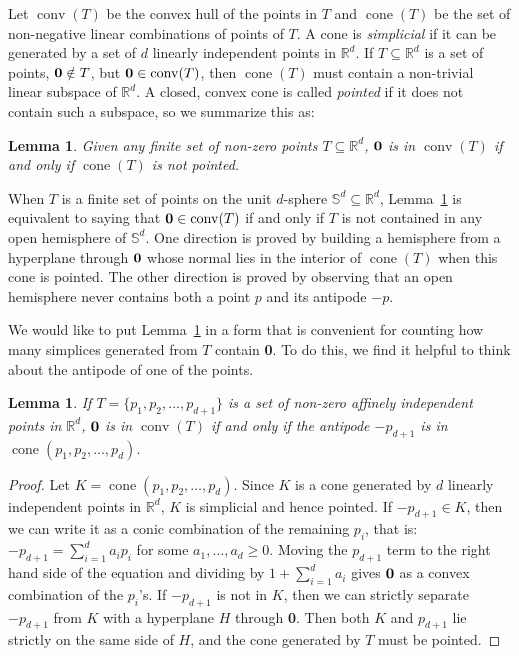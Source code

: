 \documentclass[epsbox,12pt,reqno]{amsart}
\newtheorem{lemma}[theorem]{Lemma}
\theoremstyle{definition}
\theoremstyle{remark}
\def\cone{\operatorname{cone}}
\def\conv{\operatorname{conv}}
\def\R{\mathbb{R}}
\def\Sph{\mathbb{S}}
\def\zero{{\bf 0}}
\begin{document}
Let $\conv(T)$ be the convex hull of the points in $T$ and 
$\cone(T)$ be the set of non-negative linear combinations 
of points of $T$.  A cone is {\it simplicial} if it 
can be generated by a set of $d$ linearly independent points
in $\R^d$.
If $T \subseteq \R^d$ is a set of points, $\zero \notin T$, but 
$\zero \in \conv(T)$, then $\cone(T)$ must contain a non-trivial
linear subspace of $\R^d$.  A closed, convex cone is called
{\it pointed} if it does not contain such a subspace, so we
summarize this as:
\begin{lemma}\label{le:cones}
Given any finite set of non-zero points $T \subseteq \R^d$, 
$\zero$ is in $\conv(T)$ if and
only if $\cone(T)$ is not pointed.
\end{lemma}
When $T$ is a finite set of points on the unit $d$-sphere 
$\Sph^d \subseteq \R^d$,
Lemma~\ref{le:cones} is equivalent to saying that $\zero \in \conv(T)$ 
if and only if $T$ is not contained in any open
hemisphere of $\Sph^d$.  One direction is proved by building a hemisphere
from a hyperplane through $\zero$ whose normal lies in the interior of
$\cone(T)$ when this cone is pointed.  The other direction is
proved by observing that an open hemisphere never contains both
a point $p$ and its antipode $-p$. 

We would like to put Lemma~\ref{le:cones} in a form that is convenient
for counting how many simplices generated from $T$ contain \zero.  
To do this, we find it helpful to think about the 
antipode of one of the points.
\begin{lemma}\label{le:antipodes}
If $T=\{p_1, p_2, \ldots, p_{d+1}\}$ is a set of non-zero affinely
independent points in $\R^d$,
$\zero$ is in $\conv(T)$ if and only if the antipode 
$-p_{d+1}$ is in $\cone(p_1, p_2, \ldots, p_d)$.
\end{lemma}
\begin{proof}
Let $K = \cone(p_1, p_2, \ldots, p_d)$.
Since $K$ is a cone generated by $d$ linearly independent points in 
$\R^d$, $K$ is simplicial and hence pointed.  
If $-p_{d+1} \in K$, then we can write it as a conic combination
of the remaining $p_i$, that is:
${-p_{d+1} = \sum_{i=1}^d a_i p_i}$
for some $a_1, \ldots, a_d \ge 0$.  Moving the $p_{d+1}$ term 
to the right hand side of the equation and dividing by $1+\sum_{i=1}^d a_i$
gives $\zero$ as a convex combination of the $p_i$'s.
If $-p_{d+1}$ is not in $K$, then we can
strictly separate $-p_{d+1}$ from $K$ with a hyperplane $H$ through \zero.
Then both $K$ and $p_{d+1}$ lie strictly on the same side of $H$, and the
cone generated by $T$ must be pointed.
\end{proof}
\end{document}
